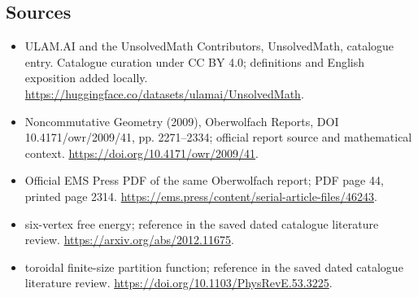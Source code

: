 \documentclass[11pt]{article}
\begin{document}
\subsection{Sources}
\begin{itemize}
\item[\hypertarget{source:statement:1}{S1}] ULAM.AI and the UnsolvedMath Contributors, UnsolvedMath, catalogue entry. Catalogue curation under CC BY 4.0; definitions and English exposition added locally.
\url{https://huggingface.co/datasets/ulamai/UnsolvedMath}.
\item[\hypertarget{source:statement:2}{S2}] Noncommutative Geometry (2009), Oberwolfach Reports, DOI 10.4171/owr/2009/41, pp. 2271--2334; official report source and mathematical context.
\url{https://doi.org/10.4171/owr/2009/41}.
\item[\hypertarget{source:statement:3}{S3}] Official EMS Press PDF of the same Oberwolfach report; PDF page 44, printed page 2314.
\url{https://ems.press/content/serial-article-files/46243}.
\item[\hypertarget{source:statement:4}{S4}] six-vertex free energy; reference in the saved dated catalogue literature review.
\url{https://arxiv.org/abs/2012.11675}.
\item[\hypertarget{source:statement:5}{S5}] toroidal finite-size partition function; reference in the saved dated catalogue literature review.
\url{https://doi.org/10.1103/PhysRevE.53.3225}.
\end{itemize}
\label{end:statement}
\end{document}
